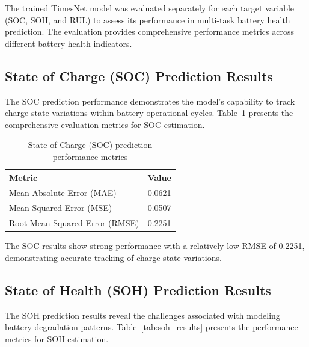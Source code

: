 The trained TimesNet model was evaluated separately for each target variable (SOC, SOH, and RUL) to assess its performance in multi-task battery health prediction. The evaluation provides comprehensive performance metrics across different battery health indicators.

\subsection{State of Charge (SOC) Prediction Results}
\label{subsec:soc_results}

The SOC prediction performance demonstrates the model's capability to track charge state variations within battery operational cycles. Table~\ref{tab:soc_results} presents the comprehensive evaluation metrics for SOC estimation.

\begin{table}[htbp]
\centering
\caption{State of Charge (SOC) prediction performance metrics}
\label{tab:soc_results}
\begin{tabular}{lc}
\hline
\textbf{Metric} & \textbf{Value} \\
\hline
Mean Absolute Error (MAE) & 0.0621 \\
Mean Squared Error (MSE) & 0.0507 \\
Root Mean Squared Error (RMSE) & 0.2251 \\
\hline
\end{tabular}
\end{table}

The SOC results show strong performance with a relatively low RMSE of 0.2251, demonstrating accurate tracking of charge state variations.


\subsection{State of Health (SOH) Prediction Results}
\label{subsec:soh_results}

The SOH prediction results reveal the challenges associated with modeling battery degradation patterns. Table~\ref{tab:soh_results} presents the performance metrics for SOH estimation.

